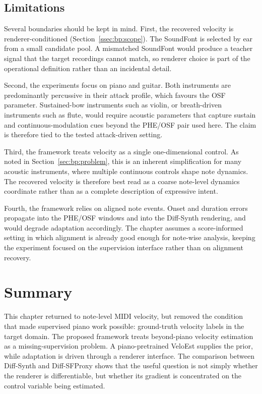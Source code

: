 \subsection{Limitations}
\label{ssec:bp:limitations}

Several boundaries should be kept in mind. First, the recovered velocity is renderer-conditioned (Section~\ref{ssec:bp:scope}). The SoundFont is selected by ear from a small candidate pool. A mismatched SoundFont would produce a teacher signal that the target recordings cannot match, so renderer choice is part of the operational definition rather than an incidental detail.

Second, the experiments focus on piano and guitar. Both instruments are predominantly percussive in their attack profile, which favours the OSF parameter. Sustained-bow instruments such as violin, or breath-driven instruments such as flute, would require acoustic parameters that capture sustain and continuous-modulation cues beyond the PHE/OSF pair used here. The claim is therefore tied to the tested attack-driven setting.

Third, the framework treats velocity as a single one-dimensional control. As noted in Section~\ref{sec:bp:problem}, this is an inherent simplification for many acoustic instruments, where multiple continuous controls shape note dynamics. The recovered velocity is therefore best read as a coarse note-level dynamics coordinate rather than as a complete description of expressive intent.

Fourth, the framework relies on aligned note events. Onset and duration errors propagate into the PHE/OSF windows and into the Diff-Synth rendering, and would degrade adaptation accordingly. The chapter assumes a score-informed setting in which alignment is already good enough for note-wise analysis, keeping the experiment focused on the supervision interface rather than on alignment recovery.

\section{Summary}
\label{sec:bp:summary}
This chapter returned to note-level MIDI velocity, but removed the condition that made supervised piano work possible: ground-truth velocity labels in the target domain. The proposed framework treats beyond-piano velocity estimation as a missing-supervision problem. A piano-pretrained VeloEst supplies the prior, while adaptation is driven through a renderer interface. The comparison between Diff-Synth and Diff-SFProxy shows that the useful question is not simply whether the renderer is differentiable, but whether its gradient is concentrated on the control variable being estimated.

